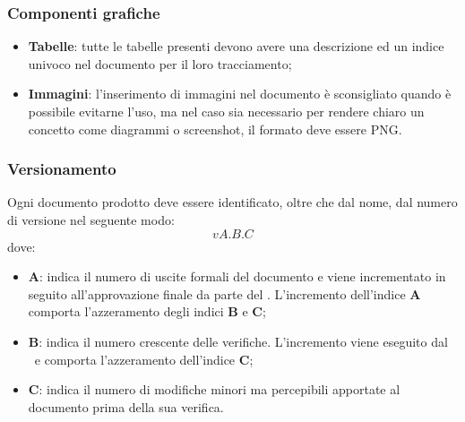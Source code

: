 \documentclass[../NormeDiProgetto.tex]{subfiles}
\begin{document}
\subsubsection{Componenti grafiche}
\begin{itemize}

\item \textbf{Tabelle}: tutte le tabelle presenti devono avere una descrizione ed un indice univoco nel documento per il loro tracciamento;
\item \textbf{Immagini}: l'inserimento di immagini nel documento è sconsigliato quando è possibile evitarne l'uso, ma nel caso sia necessario per rendere chiaro un concetto come diagrammi o screenshot, il formato deve essere PNG.
\end{itemize}

\subsubsection{Versionamento}
Ogni documento prodotto deve essere identificato, oltre che dal nome, dal numero
di versione nel seguente modo:
\begin{equation*}
  vA.B.C
\end{equation*}
dove:
\begin{itemize}
  \item \textbf{A}: indica il numero di uscite formali del documento e viene
  incrementato in seguito all'approvazione finale da parte del \responsabilediprogetto.
  L'incremento dell'indice \textbf{A} comporta l'azzeramento degli indici
  \textbf{B} e \textbf{C};
  \item \textbf{B}: indica il numero crescente delle verifiche. L'incremento viene 	eseguito dal \verificatore\ e comporta l'azzeramento dell'indice \textbf{C};
  \item \textbf{C}: indica il numero di modifiche minori ma percepibili apportate al documento prima della sua verifica.
\end{itemize}
\end{document}
